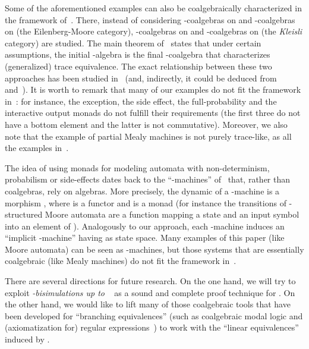 \documentclass{LMCS}
\begin{document}
Some of the aforementioned examples can also be coalgebraically
characterized in the framework of~\cite{HJS,HasuoThesis}. There, instead of
considering -coalgebras on  and -coalgebras on
 (the Eilenberg-Moore category), -coalgebras on
 and -coalgebras on  (the
\emph{Kleisli} category) are studied. The main theorem of~\cite{HJS}
states that under certain assumptions, the initial -algebra is
the final -coalgebra that characterizes (generalized)
trace equivalence. The exact relationship between these two approaches has been studied in~\cite{JSS} 
(and, indirectly, it could be deduced from~\cite{BK} and~\cite{KK}). 
It is  worth to remark that many of our examples do not fit the framework in~\cite{HJS}: for instance, the exception, the
side effect, the full-probability and the interactive output monads do not fulfill their
requirements (the first three do not have a bottom element and the
latter is not commutative). Moreover, we also note
that the example of partial Mealy machines is not purely trace-like,
as all the examples in~\cite{HJS}.



The idea of using monads for modeling automata with non-determinism, 
probabilism or side-effects dates back to the ``-machines'' of~\cite{AM75} that, rather than coalgebras, rely on algebras. 
More precisely, the dynamic of a -machine is a morphism 
, where  is a functor and  is a monad (for instance the transitions of -structured Moore automata are 
a function  mapping a state and an input symbol into an element of ).
Analogously to our approach, each -machine induces an ``implicit -machine'' having  as state space. Many examples of this paper (like Moore automata) can be seen as -machines, but those systems that are essentially coalgebraic (like Mealy machines) 
do not fit the framework in~\cite{AM75}. 



\medskip

There are several directions for future research. On the one hand, we
will try to exploit \emph{-bisimulations up to }~\cite{Lenisa99,LenisaPW00}
as a sound and complete proof technique for .
On the other hand, we would like to lift many of those coalgebraic
tools that have been developed for ``branching equivalences'' (such
as coalgebraic modal logic \cite{ml,Lutz_expressivity} and
(axiomatization for) regular expressions~\cite{BRS09b}) to work with
the ``linear equivalences'' induced by .
\end{document}
